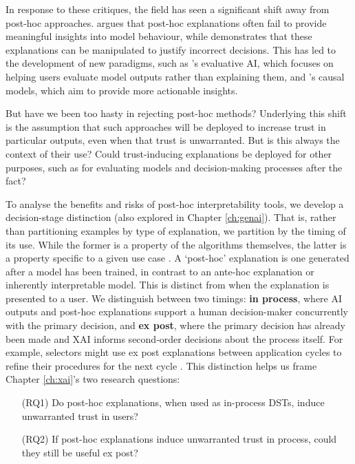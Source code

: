 In response to these critiques, the field has seen a significant shift away from post-hoc approaches. \textcite{kumar_problems_2020} argues that post-hoc explanations often fail to provide meaningful insights into model behaviour, while \textcite{Bastounis_Campodonico_vanderSchaar_Adcock_Hansen_2024} demonstrates that these explanations can be manipulated to justify incorrect decisions. This has led to the development of new paradigms, such as \textcite{miller_explainable_2023}'s evaluative AI, which focuses on helping users evaluate model outputs rather than explaining them, and \textcite{karimi_algorithmic_2021}'s causal models, which aim to provide more actionable insights.

But have we been too hasty in rejecting post-hoc methods? Underlying this shift is the assumption that such approaches will be deployed to increase trust in particular outputs, even when that trust is unwarranted. But is this always the context of their use? Could trust-inducing explanations be deployed for other purposes, such as for evaluating models and decision-making processes after the fact?

To analyse the benefits and risks of post-hoc interpretability tools, we develop a decision-stage distinction (also explored in Chapter \ref{ch:genai}). That is, rather than partitioning examples by type of explanation, we partition by the timing of its use. While the former is a property of the algorithms themselves, the latter is a property specific to a given use case \cite{natarajan_trust_2023}. A `post-hoc' explanation is one generated after a model has been trained, in contrast to an ante-hoc explanation or inherently interpretable model. This is distinct from when the explanation is presented to a user. We distinguish between two timings: \textbf{in process}, where AI outputs and post-hoc explanations support a human decision-maker concurrently with the primary decision, and \textbf{ex post}, where the primary decision has already been made and XAI informs second-order decisions about the process itself. For example, selectors might use ex post explanations between application cycles to refine their procedures for the next cycle \cite{li2020hiring}. This distinction helps us frame Chapter \ref{ch:xai}'s two research questions:

\begin{enumerate}
    \item[(RQ1)] Do post-hoc explanations, when used as in-process DSTs, induce unwarranted trust in users?
    \item[(RQ2)] If post-hoc explanations induce unwarranted trust in process, could they still be useful ex post?
\end{enumerate}


